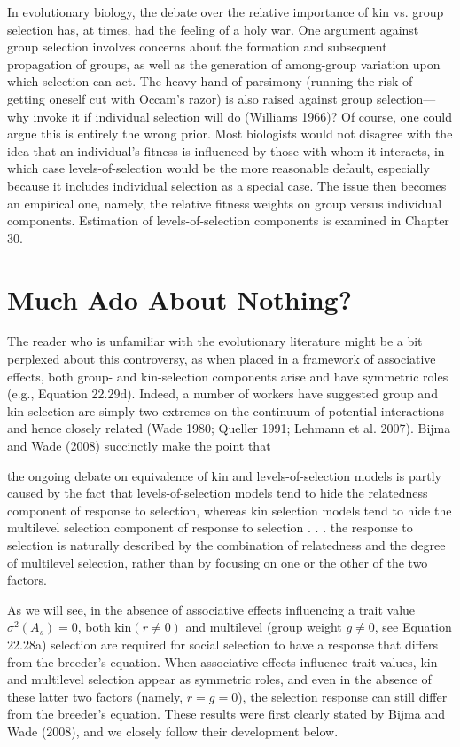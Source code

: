 \documentclass{article}
\begin{document}
In evolutionary biology, the debate over the relative importance of kin vs. group selection has, at times, had the feeling of a holy war. One argument against group selection involves concerns about the formation and subsequent propagation of groups, as well as the generation of among-group variation upon which selection can act. The heavy hand of parsimony (running the risk of getting oneself cut with Occam's razor) is also raised against group selection—why invoke it if individual selection will do (Williams 1966)? Of course, one could argue this is entirely the wrong prior. Most biologists would not disagree with the idea that an individual's fitness is influenced by those with whom it interacts, in which case levels-of-selection would be the more reasonable default, especially because it includes individual selection as a special case. The issue then becomes an empirical one, namely, the relative fitness weights on group versus individual components. Estimation of levels-of-selection components is examined in Chapter 30.

\section{Much Ado About Nothing?}
The reader who is unfamiliar with the evolutionary literature might be a bit perplexed about this controversy, as when placed in a framework of associative effects, both group- and kin-selection components arise and have symmetric roles (e.g., Equation 22.29d). Indeed, a number of workers have suggested group and kin selection are simply two extremes on the continuum of potential interactions and hence closely related (Wade 1980; Queller 1991; Lehmann et al. 2007). Bijma and Wade (2008) succinctly make the point that

the ongoing debate on equivalence of kin and levels-of-selection models is partly caused by the fact that levels-of-selection models tend to hide the relatedness component of response to selection, whereas kin selection models tend to hide the multilevel selection component of response to selection . . . the response to selection is naturally described by the combination of relatedness and the degree of multilevel selection, rather than by focusing on one or the other of the two factors.

As we will see, in the absence of associative effects influencing a trait value  $ \sigma^2(A_s) = 0 $, both  $ \text{kin}(r \neq 0) $ and multilevel (group weight  $ g \neq 0 $, see Equation 22.28a) selection are required for social selection to have a response that differs from the breeder's equation. When associative effects influence trait values, kin and multilevel selection appear as symmetric roles, and even in the absence of these latter two factors (namely,  $ r = g = 0 $), the selection response can still differ from the breeder's equation. These results were first clearly stated by Bijma and Wade (2008), and we closely follow their development below.
\end{document}

